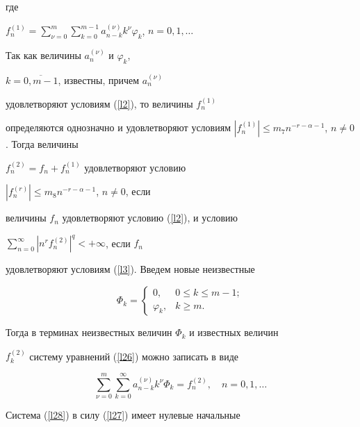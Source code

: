 где


$f_n^{(1)}=\sum\limits_{\nu=0}^{m}\sum\limits_{k=0}^{m-1}


a_{n-k}^{(\nu)}k^{\nu}\varphi_k$, $n=0,1,\dotsc$


Так как величины $a_n^{(\nu)}$ и $\varphi_k$,


$k=\overline{0,m-1}$, известны, причем $a_n^{(\nu)}$


удовлетворяют условиям (\ref{l2}), то величины $f_n^{(1)}$


определяются однозначно и удовлетворяют условиям $|f_n^{(1)}|


\leqslant m_7n^{-r-\alpha-1}$, $n\ne 0$. Тогда величины


$f_n^{(2)}=f_n+f_n^{(1)}$ удовлетворяют условию


$|f_n^{(r)}|\leqslant m_8n^{-r-\alpha-1}$, $n\ne 0$, если


величины $f_n$ удовлетворяют условию (\ref{l2}), и условию


$\sum\limits_{n=0}^\infty |n^rf_n^{(2)}|^q<+\infty$, если $f_n$


удовлетворяют условиям (\ref{l3}). Введем новые неизвестные


\begin{equation}


\label{l27}


\Phi_k=


\begin{cases}


0, & 0\leqslant k\leqslant m-1; \\


\varphi_k, & k \geqslant m.


\end{cases}


\end{equation}


Тогда в терминах неизвестных величин $\Phi_k$ и известных величин


$f_k^{(2)}$ систему уравнений (\ref{l26}) можно записать в виде


\begin{equation}\label{l28}


\sum_{\nu=0}^{m}\sum_{k=0}^{\infty}


a_{n-k}^{(\nu)}k^{\nu}\Phi_k= f_n^{(2)},\quad n=0,1,\dotsc


\end{equation}


Система (\ref{l28}) в силу (\ref{l27}) имеет нулевые начальные


